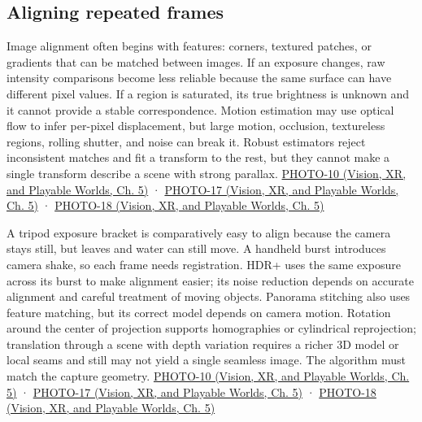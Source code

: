 \subsection{Aligning repeated frames}\label{03-visual-computing-i-ch004-aligning-repeated-frames}

\hypertarget{03-visual-computing-i-ch004-aligning-repeated-frames}{}

Image alignment often begins with features: corners, textured patches, or gradients that can be matched between images. If an exposure changes, raw intensity comparisons become less reliable because the same surface can have different pixel values. If a region is saturated, its true brightness is unknown and it cannot provide a stable correspondence. Motion estimation may use optical flow to infer per-pixel displacement, but large motion, occlusion, textureless regions, rolling shutter, and noise can break it. Robust estimators reject inconsistent matches and fit a transform to the rest, but they cannot make a single transform describe a scene with strong parallax. \href{../07-Vision-XR-and-Playable-Worlds/main.pdf\#nameddest=04-visual-computing-ii-ch036-photo-10---photography-session-10}{PHOTO-10 (Vision, XR, and Playable Worlds, Ch. 5)} · \href{../07-Vision-XR-and-Playable-Worlds/main.pdf\#nameddest=04-visual-computing-ii-ch036-photo-17---photography-session-17}{PHOTO-17 (Vision, XR, and Playable Worlds, Ch. 5)} · \href{../07-Vision-XR-and-Playable-Worlds/main.pdf\#nameddest=04-visual-computing-ii-ch036-photo-18---photography-session-18}{PHOTO-18 (Vision, XR, and Playable Worlds, Ch. 5)}

A tripod exposure bracket is comparatively easy to align because the camera stays still, but leaves and water can still move. A handheld burst introduces camera shake, so each frame needs registration. HDR+ uses the same exposure across its burst to make alignment easier; its noise reduction depends on accurate alignment and careful treatment of moving objects. Panorama stitching also uses feature matching, but its correct model depends on camera motion. Rotation around the center of projection supports homographies or cylindrical reprojection; translation through a scene with depth variation requires a richer 3D model or local seams and still may not yield a single seamless image. The algorithm must match the capture geometry. \href{../07-Vision-XR-and-Playable-Worlds/main.pdf\#nameddest=04-visual-computing-ii-ch036-photo-10---photography-session-10}{PHOTO-10 (Vision, XR, and Playable Worlds, Ch. 5)} · \href{../07-Vision-XR-and-Playable-Worlds/main.pdf\#nameddest=04-visual-computing-ii-ch036-photo-17---photography-session-17}{PHOTO-17 (Vision, XR, and Playable Worlds, Ch. 5)} · \href{../07-Vision-XR-and-Playable-Worlds/main.pdf\#nameddest=04-visual-computing-ii-ch036-photo-18---photography-session-18}{PHOTO-18 (Vision, XR, and Playable Worlds, Ch. 5)}

